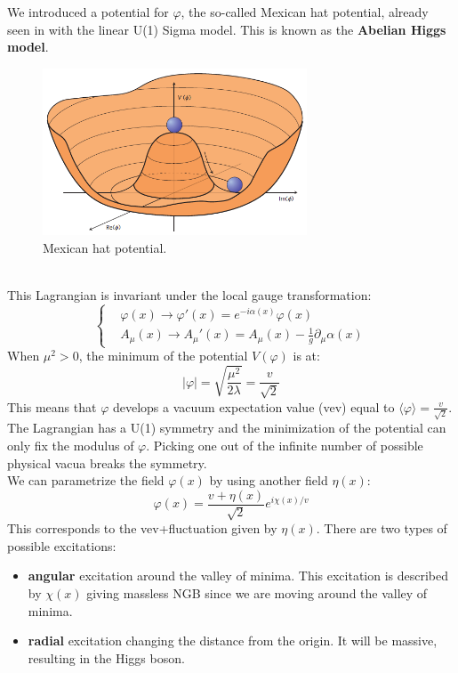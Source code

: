 \documentclass[../main.tex]{subfiles}
\begin{document}
We introduced a potential for $\varphi$, the so-called Mexican hat potential, already seen in  with the linear U(1) Sigma model. This is known as the \textbf{Abelian Higgs model}.
\begin{figure}[h]
    \centering
    \includegraphics[width=0.7\textwidth]{Images/higgspotential.png}
    \caption{Mexican hat potential.}
    \label{fig:my_label}
\end{figure}\\
This Lagrangian is invariant under the local gauge transformation:
\[
\left\{
\begin{aligned}
&\varphi(x)\to\varphi'(x)=e^{-i\alpha(x)}\varphi(x)\\    
&A_\mu(x)\to A_\mu'(x)=A_\mu(x)-\frac{1}{g}\partial_\mu\alpha(x)
\end{aligned}
\right.
\]
When $\mu^2>0$, the minimum of the potential $V(\varphi)$ is at:
\[
|\varphi|=\sqrt{\frac{\mu^2}{2\lambda}}=\frac{v}{\sqrt{2}}
\]
This means that $\varphi$ develops a vacuum expectation value (vev) equal to $\langle\varphi\rangle=\frac{v}{\sqrt{2}}$. The Lagrangian has a U(1) symmetry and the minimization of the potential can only fix the modulus of $\varphi$. Picking one out of the infinite number of possible physical vacua breaks the symmetry.\\
We can parametrize the field $\varphi(x)$ by using another field $\eta(x)$:
\[
\varphi(x)=\frac{v+\eta(x)}{\sqrt{2}}e^{i\chi(x)/v}
\]
This corresponds to the vev+fluctuation given by $\eta(x)$. There are two types of possible excitations:
\begin{itemize}
    \item \textbf{angular} excitation around the valley of minima. This excitation is described by $\chi(x)$ giving massless NGB since we are moving around the valley of minima.
    \item \textbf{radial} excitation changing the distance from the origin. It will be massive, resulting in the Higgs boson.
\end{itemize}
\end{document}
